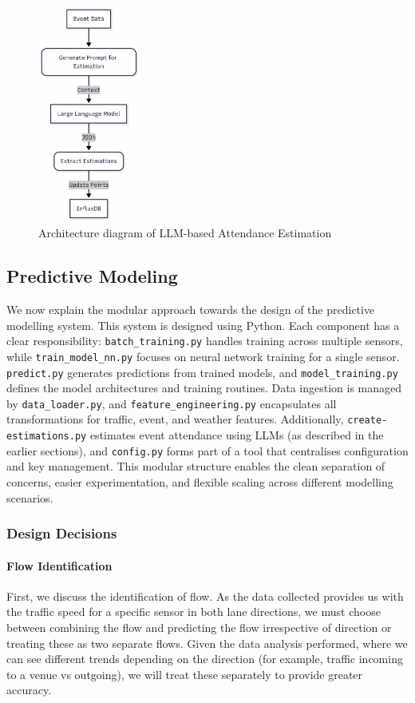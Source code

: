 \begin{figure}[!ht]
  \centering
  \includegraphics[width=0.3\textwidth]{images/design-implementation/llm-estimation.pdf}
  \caption{Architecture diagram of LLM-based Attendance Estimation}
  \label{fig:llm-estimation}
\end{figure}

\subsection{Predictive Modeling}
We now explain the modular approach towards the design of the predictive modelling system. This system is designed using Python. Each component has a clear responsibility: \verb|batch_training.py| handles training across multiple sensors, while \verb|train_model_nn.py| focuses on neural network training for a single sensor. \verb|predict.py| generates predictions from trained models, and \verb|model_training.py| defines the model architectures and training routines. Data ingestion is managed by \verb|data_loader.py|, and \verb|feature_engineering.py| encapsulates all transformations for traffic, event, and weather features. Additionally, \verb|create-estimations.py| estimates event attendance using LLMs (as described in the earlier sections), and \verb|config.py| forms part of a tool that centralises configuration and key management. This modular structure enables the clean separation of concerns, easier experimentation, and flexible scaling across different modelling scenarios.

\subsubsection{Design Decisions}
\paragraph{Flow Identification}
First, we discuss the identification of flow. As the data collected provides us with the traffic speed for a specific sensor in both lane directions, we must choose between combining the flow and predicting the flow irrespective of direction or treating these as two separate flows. Given the data analysis performed, where we can see different trends depending on the direction (for example, traffic incoming to a venue vs outgoing), we will treat these separately to provide greater accuracy.

